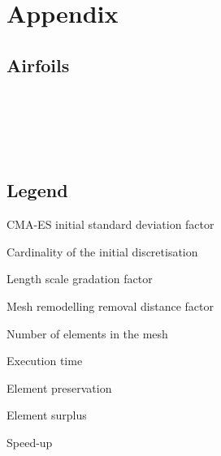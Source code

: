 \appendix
\renewcommand*{\thefigure}{A\arabic{figure}}
\setcounter{figure}{0} 
\renewcommand*{\thetable}{A\arabic{table}}
\setcounter{table}{0} 

\newpage
\section{Appendix}

\subsection{Airfoils}
\begin{center}


\vspace{0.75cm}\\


\vspace{0.75cm}\\


\vspace{0.75cm}\\


\vspace{0.75cm}\\


\end{center}

\subsection{Legend}
\begin{minipage}{0.49\linewidth}
	\begin{description}[labelsep=2em,labelwidth=0.5cm,labelindent=0.5cm, itemsep=0cm]
			\item[$\boldsymbol{\sigma}$] CMA-ES initial standard deviation factor
			\item[$\boldsymbol{I}$] Cardinality of the initial discretisation
			\item[$\boldsymbol{G}$] Length scale gradation factor
			\item[$\boldsymbol{D}$] Mesh remodelling removal distance factor
	\end{description}
\end{minipage}
\begin{minipage}{0.49\linewidth}
	\begin{description}[labelsep=2em,labelwidth=1.75cm,labelindent=0.5cm, itemsep=0cm]
		\item[\# Tri.] Number of elements in the mesh
		\item[Time] Execution time
		\item[Preserv.] Element preservation
		\item[+ Tri.] Element surplus
		\item[Sp.-up] Speed-up
	\end{description}
\end{minipage}

